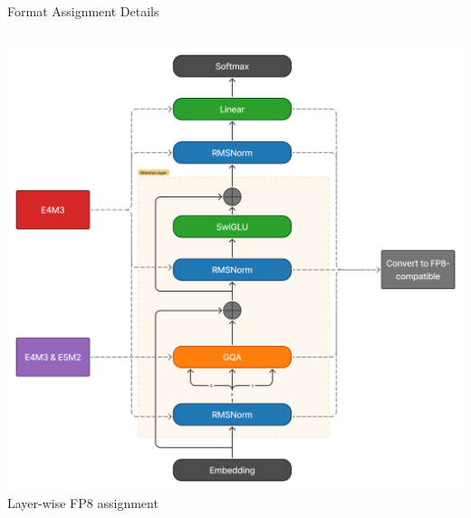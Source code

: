 \begin{frame}[squeeze]{Format Assignment Details}
\begin{columns}[c]
\begin{column}{0.40\textwidth}
    \centering
    \includegraphics[width=\textwidth]{figures/fp8_convert.png}
    \tiny Layer-wise FP8 assignment
\end{column}
\end{columns}

\end{frame}
